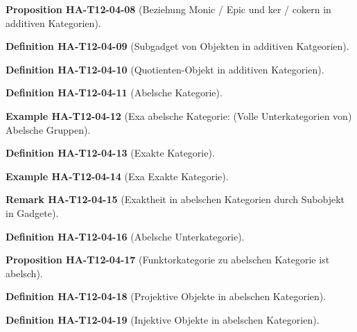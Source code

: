 \documentclass[10pt, letterpaper]{article}
\newcommand{\CustomHeading}[3]{%
  \par\medskip\noindent%
  \textbf{#1 #2} \textnormal{(#3)}.\enskip%
}
\newenvironment{DEF}[2]{\CustomHeading{Definition}{#1}{#2}}{}
\newenvironment{PROP}[2]{\CustomHeading{Proposition}{#1}{#2}}{}
\newenvironment{REM}[2]{\CustomHeading{Remark}{#1}{#2}}{}
\newenvironment{EXA}[2]{\CustomHeading{Example}{#1}{#2}}{}
\begin{document}
\begin{PROP}{HA-T12-04-08}{Beziehung Monic / Epic und ker / cokern in additiven Kategorien}
\end{PROP}

\begin{DEF}{HA-T12-04-09}{Subgadget von Objekten in additiven Katgeorien}
\end{DEF}

\begin{DEF}{HA-T12-04-10}{Quotienten-Objekt in additiven Kategorien}
\end{DEF}

\begin{DEF}{HA-T12-04-11}{Abelsche Kategorie}
\end{DEF}

\begin{EXA}{HA-T12-04-12}{Exa abelsche Kategorie: (Volle Unterkategorien von) Abelsche Gruppen}
\end{EXA}

\begin{DEF}{HA-T12-04-13}{Exakte Kategorie}
\end{DEF}

\begin{EXA}{HA-T12-04-14}{Exa Exakte Kategorie}
\end{EXA}

\begin{REM}{HA-T12-04-15}{Exaktheit in abelschen Kategorien durch Subobjekt in Gadgete}
\end{REM}

\begin{DEF}{HA-T12-04-16}{Abelsche Unterkategorie}
\end{DEF}

\begin{PROP}{HA-T12-04-17}{Funktorkategorie zu abelschen Kategorie ist abelsch}
\end{PROP}

\begin{DEF}{HA-T12-04-18}{Projektive Objekte in abelschen Kategorien}
\end{DEF}

\begin{DEF}{HA-T12-04-19}{Injektive Objekte in abelschen Kategorien}
\end{DEF}
\end{document}
